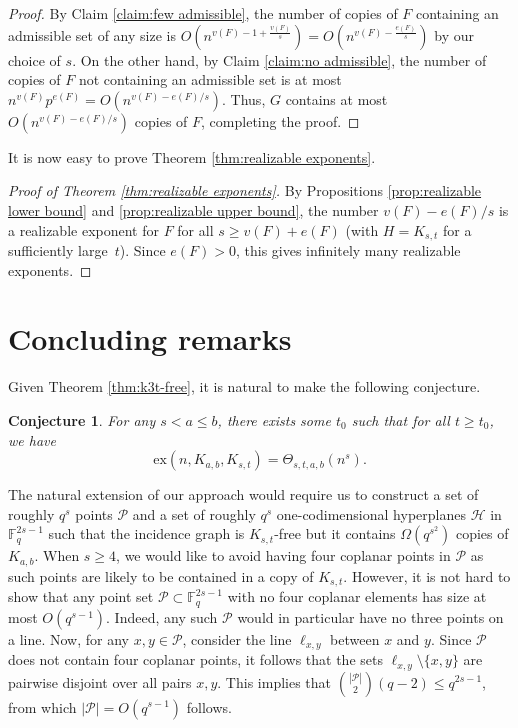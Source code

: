 \documentclass[12pt]{article}
\newtheorem{conjecture}[theorem]{Conjecture}
\newcommand{\ex}{\mathrm{ex}}
\begin{document}
\begin{proof}
        By Claim \ref{claim:few admissible}, the number of copies of $F$ containing an admissible set of any size is $O(n^{v(F) -1 + \frac{v(F)}{s}})= O(n^{v(F) - \frac{e(F)}{s}})$ by our choice of $s$. 
        On the other hand, by Claim \ref{claim:no admissible}, the number of copies of $F$ not containing an admissible set is at most $n^{v(F)}p^{e(F)}=O(n^{v(F)-e(F)/s})$. Thus, $G$ contains at most $O(n^{v(F) - e(F)/s})$ copies of $F$, completing the proof. 
    \end{proof}

It is now easy to prove Theorem \ref{thm:realizable exponents}.

\begin{proof}[Proof of Theorem \ref{thm:realizable exponents}]
    By Propositions \ref{prop:realizable lower bound} and \ref{prop:realizable upper bound}, the number $v(F)-e(F)/s$ is a realizable exponent for $F$ for all $s\geq v(F) + e(F)$ (with $H=K_{s,t}$ for a sufficiently large~$t$). Since $e(F)>0$, this gives infinitely many realizable exponents.
\end{proof}

\section{Concluding remarks}

Given Theorem \ref{thm:k3t-free}, it is natural to make the following conjecture.

\begin{conjecture}
    For any $s<a\leq b$, there exists some $t_0$ such that for all $t\geq t_0$, we have
    $$\ex(n,K_{a,b},K_{s,t})=\Theta_{s,t,a,b}(n^s).$$
\end{conjecture}

The natural extension of our approach would require us to construct a set of roughly $q^s$ points $\mathcal{P}$ and a set of roughly $q^s$ one-codimensional hyperplanes $\mathcal{H}$ in $\mathbb{F}_q^{2s-1}$ such that the incidence graph is $K_{s,t}$-free but it contains $\Omega(q^{s^2})$ copies of $K_{a,b}$. When $s\geq 4$, we would like to avoid having four coplanar points in $\mathcal{P}$ as such points are likely to be contained in a copy of $K_{s,t}$. However, it is not hard to show that any point set $\mathcal{P}\subset \mathbb{F}_q^{2s-1}$ with no four coplanar elements has size at most $O(q^{s-1})$. Indeed, any such $\mathcal{P}$ would in particular have no three points on a line. Now, for any $x,y\in \mathcal{P}$, consider the line $\ell_{x,y}$ between $x$ and $y$. Since $\mathcal{P}$ does not contain four coplanar points, it follows that the sets $\ell_{x,y}\setminus \{x,y\}$ are pairwise disjoint over all pairs $x,y$. This implies that $\binom{|\mathcal{P}|}{2}(q-2)\leq q^{2s-1}$, from which $|\mathcal{P}|=O(q^{s-1})$ follows.
\end{document}
